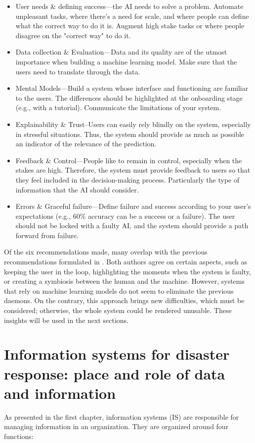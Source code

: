\begin{itemize}
    \item User needs \& defining success—the AI needs to solve a problem.
          Automate unpleasant tasks, where there's a need for scale, and where people can define what the correct way to do it is.
          Augment high stake tasks or where people disagree on the "correct way" to do it.
    \item Data collection \& Evaluation—Data and its quality are of the utmost importance when building a machine learning model.
          Make sure that the users need to translate through the data.
    \item Mental Models—Build a system whose interface and functioning are familiar to the users.
          The differences should be highlighted at the onboarding stage (e.g., with a tutorial).
          Communicate the limitations of your system.
    \item Explainability \& Trust–Users can easily rely blindly on the system, especially in stressful situations.
          Thus, the system should provide as much as possible an indicator of the relevance of the prediction.
    \item Feedback \& Control—People like to remain in control, especially when the stakes are high.
          Therefore, the system must provide feedback to users so that they feel included in the decision-making process.
          Particularly the type of information that the AI should consider.
    \item Errors \& Graceful failure—Define failure and success according to your user's expectations (e.g., 60\% accuracy can be a success or a failure).
          The user should not be locked with a faulty AI, and the system should provide a path forward from failure.
\end{itemize}

Of the six recommendations made, many overlap with the previous recommendations formulated in \textcite{endsleyDesigningSituationAwareness2016}.
Both authors agree on certain aspects, such as keeping the user in the loop, highlighting the moments when the system is faulty, or creating a symbiosis between the human and the machine.
However, systems that rely on machine learning models do not seem to eliminate the previous daemons.
On the contrary, this approach brings new difficulties, which must be considered; otherwise, the whole system could be rendered unusable.
These insights will be used in the next sections.

\section{Information systems for disaster response: place and role of data and information}
As presented in the first chapter, information systems (IS) are responsible for managing information in an organization.
They are organized around four functions:

